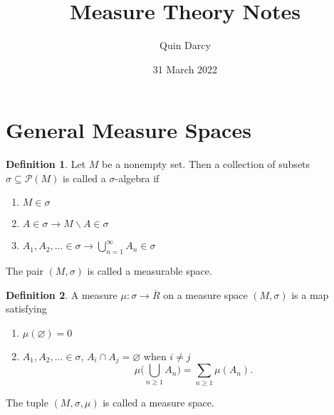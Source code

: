 \documentclass[12pt]{article}
\theoremstyle{definition}
\newtheorem{definition}{Definition}[section]
\theoremstyle{definition}
\begin{document}
\title{Measure Theory Notes}
\author{Quin Darcy}
\date{31 March 2022}
\maketitle
\section{General Measure Spaces}
    \begin{definition}
        Let $M$ be a nonempty set. Then a collection of subsets
        $\sigma\subseteq\mathcal{P}(M)$ is called a $\sigma$-algebra if 
        \begin{enumerate}
            \item $M\in\sigma$
            \item $A\in\sigma\to M\backslash A\in\sigma$
            \item $A_1, A_2, \dots\in\sigma\to\bigcup_{n=1}^{\infty}A_n\in\sigma$
        \end{enumerate}
        The pair $(M, \sigma)$ is called a measurable space. 
    \end{definition}
    \begin{definition}
        A measure $\mu:\sigma\to \overline{R}$ on a measure space $(M, \sigma)$ is
        a map satisfying
        \begin{enumerate}
            \item $\mu(\varnothing)=0$
            \item $A_1, A_2, \dots\in\sigma$, $A_i\cap A_j=\varnothing$ when $i\neq
            j$
                \begin{equation*}
                    \mu\bigg(\bigcup_{n\geq 1}A_n\bigg)=\sum_{n\geq 1}\mu(A_n).
                \end{equation*}
        \end{enumerate}
        The tuple $(M, \sigma, \mu)$ is called a measure space. 
    \end{definition}
\end{document}
